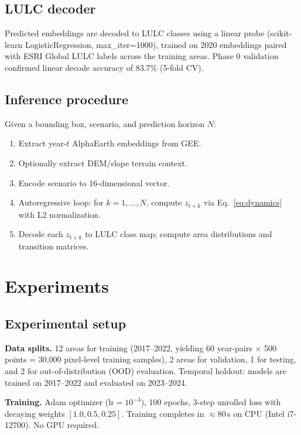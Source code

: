 \documentclass{article}
\begin{document}
\subsection{LULC decoder}

Predicted embeddings are decoded to LULC classes using a linear probe (scikit-learn LogisticRegression, max\_iter=1000), trained on 2020 embeddings paired with ESRI Global LULC labels across the training areas. Phase 0 validation confirmed linear decode accuracy of 83.7\% (5-fold CV).

\subsection{Inference procedure}

Given a bounding box, scenario, and prediction horizon $N$:
\begin{enumerate}
\item Extract year-$t$ AlphaEarth embeddings from GEE.
\item Optionally extract DEM/slope terrain context.
\item Encode scenario to 16-dimensional vector.
\item Autoregressive loop: for $k = 1, \ldots, N$, compute $z_{t+k}$ via Eq.~\ref{eq:dynamics} with L2 normalization.
\item Decode each $z_{t+k}$ to LULC class map; compute area distributions and transition matrices.
\end{enumerate}


\section{Experiments}
\label{sec:experiments}

\subsection{Experimental setup}

\textbf{Data splits.} 12 areas for training (2017--2022, yielding 60 year-pairs $\times$ 500 points = 30{,}000 pixel-level training samples), 2 areas for validation, 1 for testing, and 2 for out-of-distribution (OOD) evaluation. Temporal holdout: models are trained on 2017--2022 and evaluated on 2023--2024.

\textbf{Training.} Adam optimizer ($\text{lr} = 10^{-3}$), 100 epochs, 3-step unrolled loss with decaying weights $[1.0, 0.5, 0.25]$. Training completes in $\approx$80\,s on CPU (Intel i7-12700). No GPU required.
\end{document}
